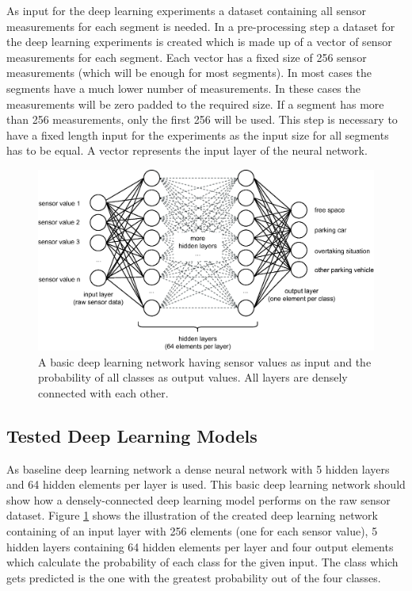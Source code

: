 
As input for the deep learning experiments a dataset containing all sensor measurements for each segment is needed. In a pre-processing step a dataset for the deep learning experiments is created which is made up of a vector of sensor measurements for each segment. Each vector has a fixed size of 256 sensor measurements (which will be enough for most segments). In most cases the segments have a much lower number of measurements. In these cases the measurements will be zero padded to the required size. If a segment has more than 256 measurements, only the first 256 will be used. This step is necessary to have a fixed length input for the experiments as the input size for all segments has to be equal. A vector represents the input layer of the neural network. 

\begin{figure}
	\centering
	\includegraphics[width=\textwidth]{img/deep_learning_basic_model_2.eps}
	\caption{A basic deep learning network having sensor values as input and the probability of all classes as output values. All layers are densely connected with each other.}
	\label{fig:densely_dl_network}
\end{figure}





\subsection{Tested Deep Learning Models}

As baseline deep learning network a dense neural network with 5 hidden layers and 64 hidden elements per layer is used. This basic deep learning network should show how a densely-connected deep learning model performs on the raw sensor dataset. Figure \ref{fig:densely_dl_network} shows the illustration of the created deep learning network containing of an input layer with 256 elements (one for each sensor value), 5 hidden layers containing 64 hidden elements per layer and four output elements which calculate the probability of each class for the given input. The class which gets predicted is the one with the greatest probability out of the four classes. 

